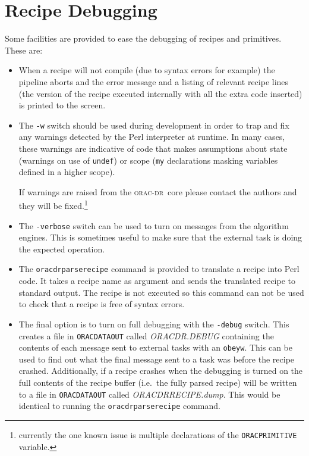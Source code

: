 \documentclass[twoside,11pt]{article}
\renewcommand{\_}{\texttt{\symbol{95}}}
\newcommand{\Oracdr}{\textsc{orac-dr}}
\begin{document}
\section{Recipe Debugging}

Some facilities are provided to ease the debugging of recipes and
primitives. These are:

\begin{itemize}

\item When a recipe will not compile (due to syntax errors for
example) the pipeline aborts and the error message and a listing of
relevant recipe lines (the version of the recipe executed internally
with all the extra code inserted) is printed to the screen.

\item The \texttt{-w} switch should be used during development 
in order to trap and fix any warnings detected by the Perl interpreter
at runtime. In many cases, these warnings are indicative of code that
makes assumptions about state (warnings on use of \texttt{undef}) or
scope (\texttt{my} declarations masking variables defined in a higher
scope). 

If warnings are raised from the \Oracdr\ core please contact the
authors and they will be fixed.\footnote{currently the one known issue 
is multiple declarations of the \texttt{ORAC\_PRIMITIVE} variable.}

\item The \texttt{-verbose} switch can be used to turn on messages from 
the algorithm engines. This is sometimes useful to make sure that the
external task is doing the expected operation.

\item The \texttt{oracdr\_parse\_recipe} command is provided to translate
a recipe into Perl code. It takes a recipe name as argument and sends the
translated recipe to standard output. The recipe is not executed so this
command can not be used to check that a recipe is free of syntax errors.

\item The final option is to turn on full debugging with the
\texttt{-debug} switch. This creates a file in
\texttt{ORAC\_DATA\_OUT} called \textit{ORACDR.DEBUG} containing the
contents of each message sent to external tasks with an
\texttt{obeyw}. This can be used to find out what the final message
sent to a task was before the recipe crashed. Additionally, if a
recipe crashes when the debugging is turned on the full contents of
the recipe buffer (i.e.\ the fully parsed recipe) will be written 
to a file in \texttt{ORAC\_DATA\_OUT} called
\textit{ORACDR\_RECIPE.dump}. This would be identical to running the
\texttt{oracdr\_parse\_recipe} command.

\end{itemize}
\end{document}
